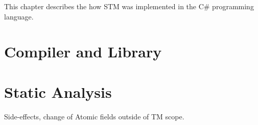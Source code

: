 \makeatletter {}\makeatother
{}
This chapter describes the how \ac{STM} was implemented in the C\# programming language.
\label{chap:implementation}
\section{Compiler and Library}
\section{Static Analysis}
Side-effects, change of Atomic fields outside of TM scope.

\worksheetend